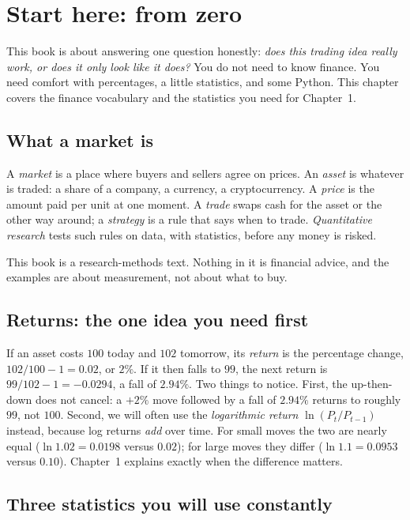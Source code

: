 \chapter*{Start here: from zero}

This book is about answering one question honestly: \emph{does this trading idea
really work, or does it only look like it does?} You do not need to know finance.
You need comfort with percentages, a little statistics, and some Python. This
chapter covers the finance vocabulary and the statistics you need for Chapter~1.

\section*{What a market is}

A \emph{market} is a place where buyers and sellers agree on prices. An
\emph{asset} is whatever is traded: a share of a company, a currency, a
cryptocurrency. A \emph{price} is the amount paid per unit at one moment. A
\emph{trade} swaps cash for the asset or the other way around; a \emph{strategy}
is a rule that says when to trade. \emph{Quantitative research} tests such rules
on data, with statistics, before any money is risked.

This book is a research-methods text. Nothing in it is financial advice, and the
examples are about measurement, not about what to buy.

\section*{Returns: the one idea you need first}

If an asset costs $100$ today and $102$ tomorrow, its \emph{return} is the
percentage change, $102/100-1=0.02$, or $2\%$. If it then falls to $99$, the next
return is $99/102-1=-0.0294$, a fall of $2.94\%$. Two things to notice. First,
the up-then-down does not cancel: a $+2\%$ move followed by a fall of $2.94\%$
returns to roughly $99$, not $100$. Second, we will often use the
\emph{logarithmic return} $\ln(P_{t}/P_{t-1})$ instead, because log returns
\emph{add} over time. For small moves the two are nearly equal ($\ln 1.02=0.0198$
versus $0.02$); for large moves they differ ($\ln 1.1=0.0953$ versus $0.10$).
Chapter~1 explains exactly when the difference matters.

\section*{Three statistics you will use constantly}

